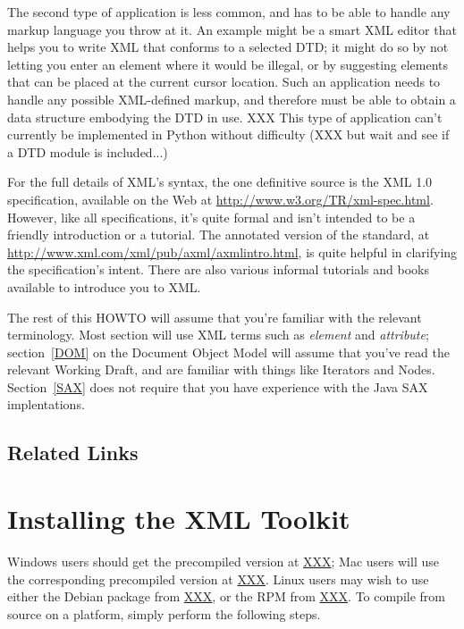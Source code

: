 \documentclass{howto}
\begin{document}
The second type of application is less common, and has to be able to
handle any markup language you throw at it.  An example might be a
smart XML editor that helps you to write XML that conforms to a
selected DTD; it might do so by not letting you enter an element where
it would be illegal, or by suggesting elements that can be placed at
the current cursor location.  Such an application needs to handle any
possible XML-defined markup, and therefore must be able to obtain a
data structure embodying the DTD in use.  XXX This type of application
can't currently be implemented in Python without difficulty (XXX but
wait and see if a DTD module is included...)

For the full details of XML's syntax, the one definitive source is the
XML 1.0 specification, available on the Web at
\url{http://www.w3.org/TR/xml-spec.html}.  However, like all
specifications, it's quite formal and isn't intended to be a friendly
introduction or a tutorial.  The annotated version of the standard, at
\url{http://www.xml.com/xml/pub/axml/axmlintro.html}, is quite helpful
in clarifying the specification's intent.  There are also various
informal tutorials and books available to introduce you to XML.

The rest of this HOWTO will assume that you're familiar with the
relevant terminology.  Most section will use XML terms such as
\emph{element} and \emph{attribute}; section~\ref{DOM} on the Document
Object Model will assume that you've read the relevant Working Draft,
and are familiar with things like Iterators and Nodes.
Section~\ref{SAX} does not require that you have experience with the
Java SAX implentations.

\subsection{Related Links}

\section{Installing the XML Toolkit}

Windows users should get the precompiled version at \url{XXX}; Mac
users will use the corresponding precompiled version at \url{XXX}.
Linux users may wish to use either the Debian package from \url{XXX},
or the RPM from \url{XXX}.  To compile from source on a \UNIX{} platform,
simply perform the following steps.
\end{document}
